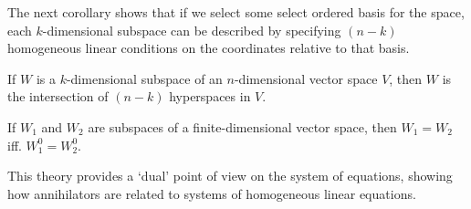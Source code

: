 The next corollary shows that if we select some select ordered basis for the space, each $k$-dimensional subspace can be described by specifying $(n-k)$ homogeneous linear conditions on the coordinates relative to that basis.

\begin{corollary}
	If $W$ is a $k$-dimensional subspace of an $n$-dimensional vector space $V$, then $W$ is the intersection of $(n-k)$ hyperspaces in $V$.
\end{corollary}

\begin{corollary}\label{cor:determined-annihilator}
	If $W_1$ and $W_2$ are subspaces of a finite-dimensional vector space, then $W_1 = W_2$ iff. $W_1^0 = W_2^0$.
\end{corollary}

This theory provides a `dual' point of view on the system of equations, showing how annihilators are related to systems of homogeneous linear equations.

